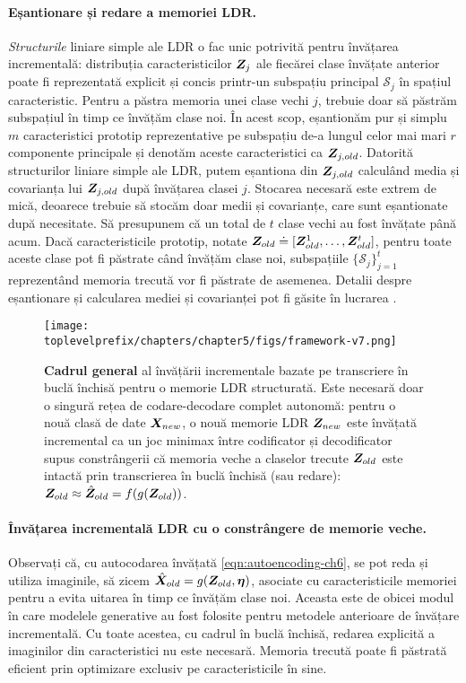 \documentclass[../../book-main_ro.tex]{subfiles}
\begin{document}
\paragraph{Eșantionare și redare a memoriei LDR.} {\em Structurile} liniare simple ale LDR o fac unic potrivită pentru învățarea incrementală: distribuția caracteristicilor $\bm{Z}_j$ ale fiecărei clase învățate anterior poate fi reprezentată explicit și concis printr-un subspațiu principal $\mathcal{S}_j$ în spațiul caracteristic. Pentru a păstra memoria unei clase vechi $j$, trebuie doar să păstrăm subspațiul în timp ce învățăm clase noi. În acest scop, eșantionăm pur și simplu $m$ caracteristici prototip reprezentative pe subspațiu de-a lungul celor mai mari $r$ componente principale și denotăm aceste caracteristici ca $\bm{Z}_{j,old}$. Datorită structurilor liniare simple ale LDR, putem eșantiona din $\bm{Z}_{j,old}$ calculând media și covarianța lui $\bm{Z}_{j,old}$ după învățarea clasei $j$. Stocarea necesară este extrem de mică, deoarece trebuie să stocăm doar medii și covarianțe, care sunt eșantionate după necesitate. Să presupunem că un total de $t$ clase vechi au fost învățate până acum. Dacă caracteristicile prototip, notate $\bm{Z}_{old} \doteq [\bm{Z}^1_{old},\ldots, \bm{Z}^t_{old}]$, pentru toate aceste clase pot fi păstrate când învățăm clase noi, subspațiile $\{\mathcal{S}_j\}_{j=1}^t$ reprezentând memoria trecută vor fi păstrate de asemenea. Detalii despre eșantionare și calcularea mediei și covarianței pot fi găsite în lucrarea \cite{tong2023incremental}.

\begin{figure*}[t]
\centering
\texttt{[image: \\toplevelprefix/chapters/chapter5/figs/framework-v7.png]}
\caption{\textbf{Cadrul general} al învățării incrementale bazate pe transcriere în buclă închisă pentru o memorie LDR structurată. Este necesară doar o singură rețea de codare-decodare complet autonomă: pentru o nouă clasă de date $\bm{X}_{new}$, o nouă memorie LDR $\bm{Z}_{new}$ este învățată incremental ca un joc minimax între codificator și decodificator supus constrângerii că memoria veche a claselor trecute $\bm{Z}_{old}$ este intactă prin transcrierea în buclă închisă (sau redare): $\bm{Z}_{old} \approx \hat{\bm{Z}}_{ old} = f(g(\bm{Z}_{ old}))$.
\vspace{-0.2in}}
\label{fig:framework}
\end{figure*}

\paragraph{Învățarea incrementală LDR cu o constrângere de memorie veche.}
Observați că, cu autocodarea învățată \eqref{eqn:autoencoding-ch6}, se pot reda și utiliza imaginile, să zicem $\hat{\bm{X}}_{old} = g(\bm{Z}_{old}, \bm \eta)$, asociate cu caracteristicile memoriei pentru a evita uitarea în timp ce învățăm clase noi. Aceasta este de obicei modul în care modelele generative au fost folosite pentru metodele anterioare de învățare incrementală. Cu toate acestea, cu cadrul în buclă închisă, redarea explicită a imaginilor din caracteristici nu este necesară. Memoria trecută poate fi păstrată eficient prin optimizare exclusiv pe caracteristicile în sine.
\end{document}
